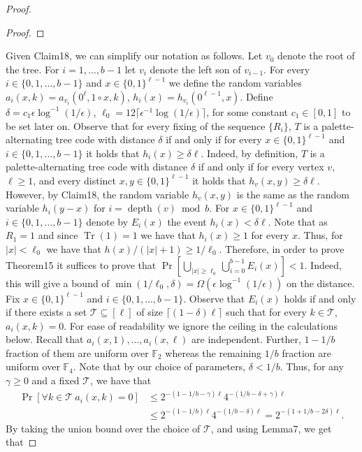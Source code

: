 \begin{proof}
\begin{proof}
\end{proof}
Given Claim18, we can simplify our notation as follows. Let $v_0$ denote the root of the tree. For $i=1,\ldots,b-1$ let $v_i$ denote the left son of $v_{i-1}$. For every $i\in\{0,1,\ldots,b-1\}$ and $x\in\{0,1\}^{\ell-1}$ we define the random variables $a_i(x,k)=a_{v_i}(0^\ell,1\circ x,k)$, $h_i(x)=h_{v_i}(0^{\ell-1},x)$.
Define $\delta=c_1\epsilon\log^{-1}(1/\epsilon)$, $\ell_0=12\lceil\epsilon^{-1}\log(1/\epsilon)\rceil$, for some constant $c_1\in[0,1]$ to be set later on. Observe that for every fixing of the sequence $\{R_i\}$, $T$ is a palette-alternating tree code with distance $\delta$ if and only if for every $x\in\{0,1\}^{\ell-1}$ and $i\in\{0,1,\ldots,b-1\}$ it holds that $h_i(x)\ge\delta\ell$. Indeed, by definition, $T$ is a palette-alternating tree code with distance $\delta$ if and only if for every vertex $v$, $\ell\ge1$, and every distinct $x,y\in\{0,1\}^{\ell-1}$ it holds that $h_v(x,y)\ge\delta\ell$. However, by Claim18, the random variable $h_v(x,y)$ is the same as the random variable $h_i(y-x)$ for $i=\operatorname{depth}(v)\bmod b$.
For $x\in\{0,1\}^{\ell-1}$ and $i\in\{0,1,\ldots,b-1\}$ denote by $E_i(x)$ the event $h_i(x)<\delta\ell$. Note that as $R_1=1$ and since $\operatorname{Tr}(1)=1$ we have that $h_i(x)\ge1$ for every $x$. Thus, for $|x|<\ell_0$ we have that $h(x)/(|x|+1)\ge1/\ell_0$. Therefore, in order to prove Theorem15 it suffices to prove that $\Pr[\bigcup_{|x|\ge\ell_0}\bigcup_{i=0}^{b-1}E_i(x)]<1$.
Indeed, this will give a bound of $\min(1/\ell_0,\delta)=\Omega(\epsilon\log^{-1}(1/\epsilon))$ on the distance.
Fix $x\in\{0,1\}^{\ell-1}$ and $i\in\{0,1,\ldots,b-1\}$. Observe that $E_i(x)$ holds if and only if there exists a set $\mathcal T\subseteq[\ell]$ of size $\lceil(1-\delta)\ell\rceil$ such that for every $k\in\mathcal T$, $a_i(x,k)=0$. For ease of readability we ignore the ceiling in the calculations below. Recall that $a_i(x,1),\ldots,a_i(x,\ell)$ are independent. Further, $1-1/b$ fraction of them are uniform over $\mathbb F_2$ whereas the remaining $1/b$ fraction are uniform over $\mathbb F_4$. Note that by our choice of parameters, $\delta<1/b$. Thus, for any $\gamma\ge0$ and a fixed $\mathcal T$, we have that
\begin{align*}
\Pr[\forall k\in\mathcal T\ a_i(x,k)=0]
&\le2^{-(1-1/b-\gamma)\ell}4^{-(1/b-\delta+\gamma)\ell}\\
&\le2^{-(1-1/b)\ell}4^{-(1/b-\delta)\ell}
=2^{-(1+1/b-2\delta)\ell}.
\end{align*}
By taking the union bound over the choice of $\mathcal T$, and using Lemma7, we get that

\end{proof}
